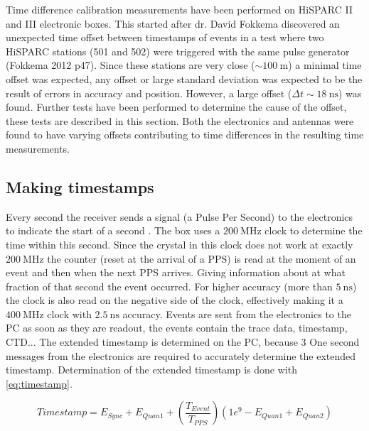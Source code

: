 Time difference calibration measurements have been performed on
HiSPARC II and III electronic boxes. This started after dr. David
Fokkema discovered an unexpected time offset between timestamps of
events in a test where two HiSPARC stations (501 and 502) were triggered
with the same pulse generator (Fokkema 2012 p47). Since these stations
are very close ($\sim\SI{100}{\meter}$) a minimal time offset was
expected, any offset or large standard deviation was expected to be the
result of errors in \gps accuracy and position. However, a large offset
($\Delta t \sim\SI{18}{\nano\second}$) was found. Further tests have
been performed to determine the cause of the offset, these tests are
described in this section. Both the \hisparc electronics and \gps
antennas were found to have varying offsets contributing to time
differences in the resulting time measurements.


\subsection{Making timestamps}
\label{sub:gps_timestamps}

Every second the \gps receiver sends a signal (a Pulse Per Second) to
the \hisparc electronics to indicate the start of a second
\cite{messages}. The \hisparc box uses a $\SI{200}{\mega\hertz}$ clock
to determine the time within this second. Since the crystal in this
clock does not work at exactly $\SI{200}{\mega\hertz}$ the counter
(reset at the arrival of a PPS) is read at the moment of an event and
then when the next PPS arrives. Giving information about at what
fraction of that second the event occurred. For higher accuracy (more
than $\SI{5}{\nano\second}$) the clock is also read on the negative side
of the clock, effectively making it a $\SI{400}{\mega\hertz}$ clock with
$\SI{2.5}{\nano\second}$ accuracy. Events are sent from the \hisparc
electronics to the PC as soon as they are readout, the events contain the trace data, timestamp, CTD... The extended timestamp is
determined on the PC, because 3 One second messages from the electronics are required to accurately determine the extended timestamp. Determination of the extended timestamp is done with \eqref{eq:timestamp}.

\begin{equation}
\label{eq:timestamp}
    Timestamp = E_{Sync} + E_{Quan1} + \left(\frac{T_{Event}}{T_{PPS}}\right)
                 \left(1e^9 - E_{Quan1} + E_{Quan2}\right)
\end{equation}

